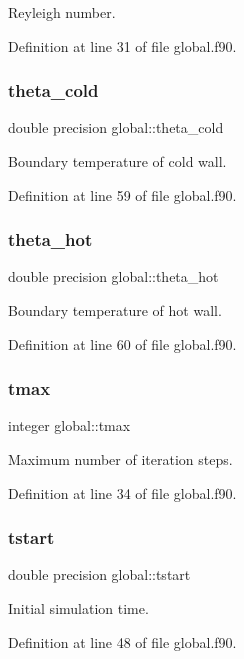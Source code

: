 Reyleigh number. 



Definition at line 31 of file global.\+f90.

\mbox{\label{namespaceglobal_a367640054e0083add94204f1a61bd61a}} 
\subsubsection{\texorpdfstring{theta\_cold}{theta\_cold}}
{\footnotesize\ttfamily double precision global\+::theta\+\_\+cold}



Boundary temperature of cold wall. 



Definition at line 59 of file global.\+f90.

\mbox{\label{namespaceglobal_a63b846fbcd5aedd45f92a0b1eb972244}} 
\subsubsection{\texorpdfstring{theta\_hot}{theta\_hot}}
{\footnotesize\ttfamily double precision global\+::theta\+\_\+hot}



Boundary temperature of hot wall. 



Definition at line 60 of file global.\+f90.

\mbox{\label{namespaceglobal_ac8816f9dd096716fb9b7e61d57cc5189}} 
\subsubsection{\texorpdfstring{tmax}{tmax}}
{\footnotesize\ttfamily integer global\+::tmax}



Maximum number of iteration steps. 



Definition at line 34 of file global.\+f90.

\mbox{\label{namespaceglobal_a07363365436fd22a91cdb5a847b4bb88}} 
\subsubsection{\texorpdfstring{tstart}{tstart}}
{\footnotesize\ttfamily double precision global\+::tstart}



Initial simulation time. 



Definition at line 48 of file global.\+f90.

